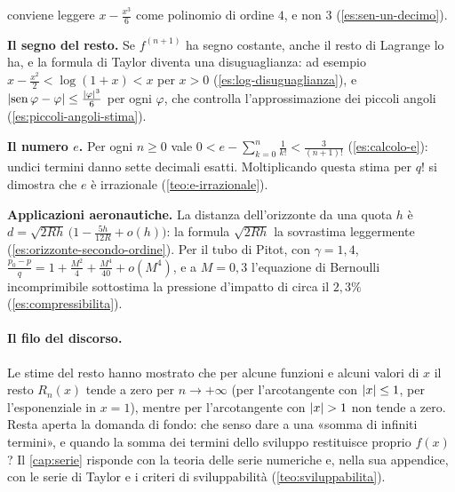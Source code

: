 \begin{puntichiave}
conviene leggere $x-\frac{x^{3}}6$ come polinomio di ordine $4$, e non $3$
(\cref{es:sen-un-decimo}).
\item \textbf{Il segno del resto.} Se $f^{(n+1)}$ ha segno costante, anche il resto di
Lagrange lo ha, e la formula di Taylor diventa una disuguaglianza: ad esempio
$x-\frac{x^{2}}2<\log(1+x)<x$ per $x>0$ (\cref{es:log-disuguaglianza}), e
$\lvert \operatorname{sen}\varphi-\varphi\rvert\le\frac{\lvert \varphi\rvert^{3}}6$ per ogni $\varphi$, che controlla
l'approssimazione dei piccoli angoli (\cref{es:piccoli-angoli-stima}).
\item \textbf{Il numero $e$.} Per ogni $n\ge0$ vale
$0<e-\sum_{k=0}^{n}\frac1{k!}<\frac3{(n+1)!}$ (\cref{es:calcolo-e}): undici termini danno sette
decimali esatti. Moltiplicando questa stima per $q!$ si dimostra che $e$ è irrazionale
(\cref{teo:e-irrazionale}).
\item \textbf{Applicazioni aeronautiche.} La distanza dell'orizzonte da una quota $h$ è
$d=\sqrt{2Rh}\,\bigl(1-\frac{5h}{12R}+o(h)\bigr)$: la formula $\sqrt{2Rh}$ la sovrastima
leggermente (\cref{es:orizzonte-secondo-ordine}). Per il tubo di Pitot, con $\gamma=1{,}4$,
$\frac{p_{0}-p}{q}=1+\frac{M^{2}}4+\frac{M^{4}}{40}+o(M^{4})$, e a $M=0{,}3$ l'equazione di
Bernoulli incomprimibile sottostima la pressione d'impatto di circa il $2{,}3\%$
(\cref{es:compressibilita}).
\end{puntichiave}

\paragraph{Il filo del discorso.} Le stime del resto hanno mostrato che per alcune
funzioni e alcuni valori di $x$ il resto $R_{n}(x)$ tende a zero per $n\to+\infty$ (per
l'arcotangente con $\lvert x\rvert\le1$, per l'esponenziale in $x=1$), mentre per l'arcotangente
con $\lvert x\rvert>1$ non tende a zero.
Resta aperta la domanda di fondo: che senso dare a una «somma di infiniti termini», e
quando la somma dei termini dello sviluppo restituisce proprio $f(x)$? Il
\cref{cap:serie} risponde con la teoria delle serie numeriche e, nella sua appendice,
con le serie di Taylor e i criteri di sviluppabilità (\cref{teo:sviluppabilita}).
